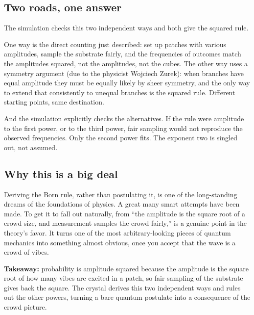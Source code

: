 \subsection{Two roads, one answer}

The simulation checks this two independent ways and both give the squared rule.

One way is the direct counting just described: set up patches with various amplitudes, sample the substrate fairly, and the frequencies of outcomes match the amplitudes squared, not the amplitudes, not the cubes. The other way uses a symmetry argument (due to the physicist Wojciech Zurek): when branches have equal amplitude they must be equally likely by sheer symmetry, and the only way to extend that consistently to unequal branches is the squared rule. Different starting points, same destination.

And the simulation explicitly checks the alternatives. If the rule were amplitude to the first power, or to the third power, fair sampling would not reproduce the observed frequencies. Only the second power fits. The exponent two is singled out, not assumed.

\subsection{Why this is a big deal}

Deriving the Born rule, rather than postulating it, is one of the long-standing dreams of the foundations of physics. A great many smart attempts have been made. To get it to fall out naturally, from ``the amplitude is the square root of a crowd size, and measurement samples the crowd fairly,'' is a genuine point in the theory's favor. It turns one of the most arbitrary-looking pieces of quantum mechanics into something almost obvious, once you accept that the wave is a crowd of vibes.

\textbf{Takeaway:} probability is amplitude squared because the amplitude is the square root of how many vibes are excited in a patch, so fair sampling of the substrate gives back the square. The crystal derives this two independent ways and rules out the other powers, turning a bare quantum postulate into a consequence of the crowd picture.
